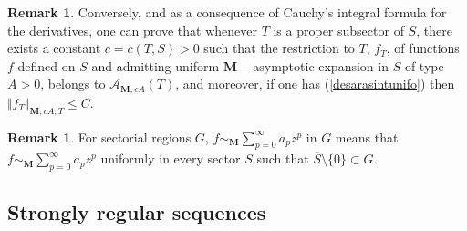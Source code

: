 \documentclass[11pt,a4paper,leqno]{article}
\theoremstyle{plain}
\theoremstyle{definition}
\newtheorem{rem}[theo]{Remark}
\def\bM{\boldsymbol{M}}
\begin{document}
\begin{rem}\label{remaCarlclassasympexpan}
Conversely, and as a consequence of Cauchy's integral formula for the derivatives, one can prove that whenever $T$ is a proper subsector of $S$, there exists a constant $c=c(T,S)>0$ such that the restriction to $T$, $f_T$, of functions $f$ defined on $S$ and admitting uniform $\bM-$asymptotic expansion in $S$ of type $A>0$, belongs to $\mathcal{A}_{\bM,cA}(T)$, and moreover, if one has (\ref{desarasintunifo}) then $\Vert f_T\Vert_{\bM,cA,T}\le C$.
\end{rem}

\begin{rem}\label{remaasympexpansectoregio}
For sectorial regions $G$, $f\sim_{\bM}\sum_{p=0}^{\infty}a_pz^p$ in $G$ means that $f\sim_{\bM}\sum_{p=0}^{\infty}a_pz^p$ uniformly in every sector $S$ such that $\overline{S}\setminus\{0\}\subset G$.
\end{rem}

\subsection{Strongly regular sequences}\label{strregseq}
\end{document}

